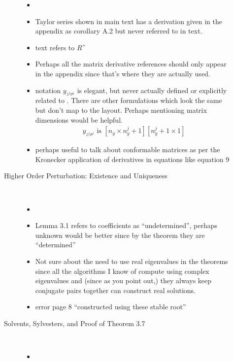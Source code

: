 \documentclass{article}
\newcommand{\ny}{n_y}
\begin{document}
\begin{description}
\begin{description}
    \begin{itemize}
    \item \sap
    \item Taylor series shown in main text has a 
derivation given in the appendix as corollary A.2 but never referred to in text.
\item text refers to $R^+$
\item Perhaps all the matrix derivative references should only appear in the
appendix since that's where they are actually used.
\item notation  $y_{z^j\sigma^i}$ is elegant, but never actually defined or 
explicitly related to \cite{vetter1973}. There are other formulations which 
look the same but don't map to the \cite{vetter1973} layout. Perhaps mentioning
matrix dimensions would be helpful.
  \begin{gather*}
    y_{z^j\sigma^i} \text{ is } [\ny \times \ny^j +1][\ny^j +1 \times 1]
  \end{gather*}
\item perhaps useful to talk about conformable matrices as per the Kronecker application of derivatives in equations like equation 9
    \end{itemize}

  \item[Higher Order Perturbation: Existence and Uniqueness]\ 

    \begin{itemize}
    \item \sap
\item Lemma 3.1 refers to coefficients as ``undetermined'', perhaps 
unknown would
be better since by the theorem they are ``determined''
\item Not sure about the need to use real eigenvalues in the theorems since all the algorithms I know of compute using complex eigenvalues and (since as you point out,) they always keep conjugate pairs together can construct real solutions.
\item error page 8 ``constructed using these stable root''
    \end{itemize}
  \item[Solvents, Sylvesters, and Proof of Theorem 3.7]\ 


    \begin{itemize}
    \item \sap


\end{itemize}
\end{description}
\end{description}
\end{document}
